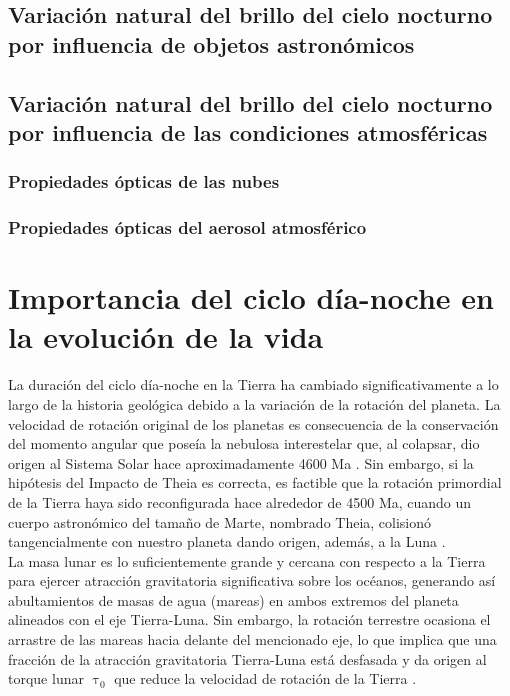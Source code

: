 \subsection{Variación natural del brillo del cielo nocturno por influencia de objetos astronómicos}

\subsection{Variación natural del brillo del cielo nocturno por influencia de las condiciones atmosféricas}

\subsubsection{Propiedades ópticas de las nubes}

\subsubsection{Propiedades ópticas del aerosol atmosférico}


\section{Importancia del ciclo día-noche en la evolución de la vida}

La duración del ciclo día-noche en la Tierra ha cambiado significativamente a lo largo de la historia geológica debido a la variación de la rotación del planeta. La velocidad de rotación original de los planetas  es consecuencia de la conservación del momento angular que poseía la nebulosa interestelar que, al colapsar, dio origen al Sistema Solar hace aproximadamente 4600 Ma \citep{Greaves2005}. Sin embargo, si la hipótesis del Impacto de Theia es correcta, es factible que la rotación primordial de la Tierra haya sido reconfigurada hace alrededor de 4500 Ma, cuando un cuerpo astronómico del tamaño de Marte, nombrado Theia, colisionó tangencialmente con nuestro planeta dando origen, además, a la Luna \citep{Stevenson1987}.\\

La masa lunar es lo suficientemente grande y cercana con respecto a la Tierra para ejercer atracción gravitatoria significativa sobre los océanos, generando así abultamientos de masas de agua (mareas) en ambos extremos del planeta alineados con el eje Tierra-Luna. Sin embargo, la rotación terrestre ocasiona el arrastre de las mareas hacia delante del mencionado eje, lo que implica que una fracción de la atracción gravitatoria Tierra-Luna está desfasada y da origen al torque lunar $\uptau_0$ que reduce la velocidad de rotación de la Tierra \citep{Conway1982}.\\ 

